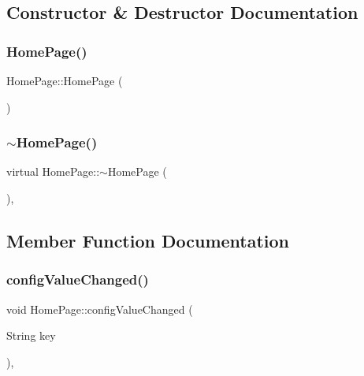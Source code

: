 \subsection{Constructor \& Destructor Documentation}
\mbox{\label{classHomePage_a49bf8e72132243658f2f193e8ac2333b}} 
\subsubsection{\texorpdfstring{Home\+Page()}{HomePage()}}
{\footnotesize\ttfamily Home\+Page\+::\+Home\+Page (\begin{DoxyParamCaption}{ }\end{DoxyParamCaption})}

\mbox{\label{classHomePage_a3e4706d65665ce5118f38936a957c9d3}} 
\subsubsection{\texorpdfstring{$\sim$\+Home\+Page()}{~HomePage()}}
{\footnotesize\ttfamily virtual Home\+Page\+::$\sim$\+Home\+Page (\begin{DoxyParamCaption}{ }\end{DoxyParamCaption})\hspace{0.3cm}{\ttfamily [inline]}, {\ttfamily [virtual]}}



\subsection{Member Function Documentation}
\mbox{\label{classHomePage_a06ddd5a30efb7eb20cb4186a63d4dbbb}} 
\subsubsection{\texorpdfstring{config\+Value\+Changed()}{configValueChanged()}}
{\footnotesize\ttfamily void Home\+Page\+::config\+Value\+Changed (\begin{DoxyParamCaption}\item[{String}]{key }\end{DoxyParamCaption})\hspace{0.3cm}{\ttfamily [protected]}, {\ttfamily [virtual]}}

